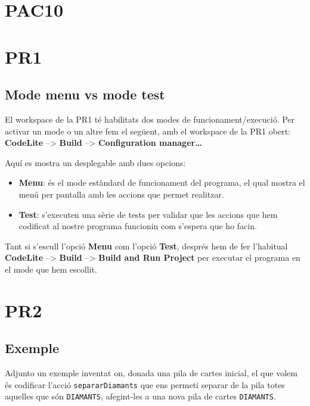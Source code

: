 \documentclass[]{book}
\providecommand{\tightlist}{%
  \setlength{\itemsep}{0pt}\setlength{\parskip}{0pt}}
\begin{document}
\chapter{PAC10}\label{pac10}

\chapter{PR1}\label{pr1}

\section{Mode menu vs mode test}\label{mode-menu-vs-mode-test}

El workspace de la PR1 té habilitats dos modes de funcionament/execució.
Per activar un mode o un altre fem el següent, amb el workspace de la
PR1 obert: \textbf{CodeLite} --\textgreater{} \textbf{Build}
--\textgreater{} \textbf{Configuration manager\ldots{}}

Aquí es mostra un desplegable amb dues opcions:

\begin{itemize}
\tightlist
\item
  \textbf{Menu}: és el mode estàndard de funcionament del programa, el
  qual mostra el menú per pantalla amb les accions que permet realitzar.
\item
  \textbf{Test}: s'executen una sèrie de tests per validar que les
  accions que hem codificat al nostre programa funcionin com s'espera
  que ho facin.
\end{itemize}

Tant si s'escull l'opció \textbf{Menu} com l'opció \textbf{Test},
després hem de fer l'habitual \textbf{CodeLite} --\textgreater{}
\textbf{Build} --\textgreater{} \textbf{Build and Run Project} per
executar el programa en el mode que hem escollit.

\chapter{PR2}\label{pr2}

\section{Exemple}\label{exemple-5}

Adjunto un exemple inventat on, donada una pila de cartes inicial, el
que volem és codificar l'acció \texttt{separarDiamants} que ens permeti
separar de la pila totes aquelles que són \texttt{DIAMANTS}, afegint-les
a una nova pila de cartes \texttt{DIAMANTS}.
\end{document}
